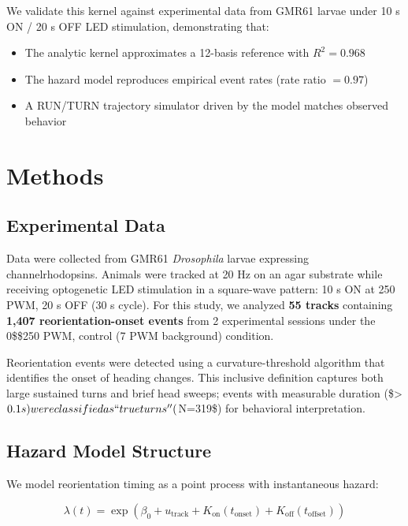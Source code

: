 \documentclass[
  11pt,
  letterpaper,
]{article}
\begin{document}
We validate this kernel against experimental data from GMR61 larvae
under 10 s ON / 20 s OFF LED stimulation, demonstrating that:

\begin{itemize}
    \item The analytic kernel approximates a 12-basis reference with $R^2 = 0.968$
    \item The hazard model reproduces empirical event rates (rate ratio $= 0.97$)
    \item A RUN/TURN trajectory simulator driven by the model matches observed behavior
\end{itemize}

\section{Methods}

\subsection{Experimental Data}

Data were collected from GMR61 \textit{Drosophila} larvae expressing
channelrhodopsins. Animals were tracked at 20 Hz on an agar substrate
while receiving optogenetic LED stimulation in a square-wave pattern: 10
s ON at 250 PWM, 20 s OFF (30 s cycle). For this study, we analyzed
\textbf{55 tracks} containing \textbf{1,407 reorientation-onset events}
from 2 experimental sessions under the 0\$\rightarrow\$250 PWM, control
(7 PWM background) condition.

Reorientation events were detected using a curvature-threshold algorithm
that identifies the onset of heading changes. This inclusive definition
captures both large sustained turns and brief head sweeps; events with
measurable duration
(\$\textgreater{}\(0.1 s) were classified as ``true turns'' (\)N=319\$)
for behavioral interpretation.

\subsection{Hazard Model Structure}

We model reorientation timing as a point process with instantaneous
hazard:

\begin{equation}
\lambda(t) = \exp\left(\beta_0 + u_{\text{track}} + K_{\text{on}}(t_{\text{onset}}) + K_{\text{off}}(t_{\text{offset}})\right)
\label{eq:hazard}
\end{equation}
\end{document}

